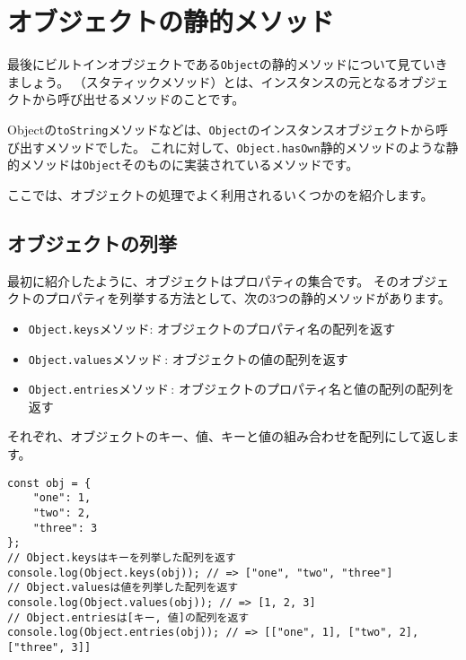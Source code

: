 \hypertarget{static-method}{%
\section{オブジェクトの静的メソッド}\label{static-method}}

最後にビルトインオブジェクトである\texttt{Object}の静的メソッドについて見ていきましょう。
\textbf{}（スタティックメソッド）とは、インスタンスの元となるオブジェクトから呼び出せるメソッドのことです。

Objectの\texttt{toString}メソッドなどは、\texttt{Object}のインスタンスオブジェクトから呼び出すメソッドでした。
これに対して、\texttt{Object.hasOwn}静的メソッドのような静的メソッドは\texttt{Object}そのものに実装されているメソッドです。

ここでは、オブジェクトの処理でよく利用されるいくつかの\textbf{}を紹介します。

\hypertarget{enumeration}{%
\subsection{オブジェクトの列挙}\label{enumeration}}

最初に紹介したように、オブジェクトはプロパティの集合です。
そのオブジェクトのプロパティを列挙する方法として、次の3つの静的メソッドがあります。

\begin{itemize}
\item
  \texttt{Object.keys}メソッド:
  オブジェクトのプロパティ名の配列を返す
\item
  \texttt{Object.values}メソッド\,\protect{}:
  オブジェクトの値の配列を返す
\item
  \texttt{Object.entries}メソッド\,\protect{}:
  オブジェクトのプロパティ名と値の配列の配列を返す
\end{itemize}

それぞれ、オブジェクトのキー、値、キーと値の組み合わせを配列にして返します。

\begin{lstlisting}
const obj = {
    "one": 1,
    "two": 2,
    "three": 3
};
// Object.keysはキーを列挙した配列を返す
console.log(Object.keys(obj)); // => ["one", "two", "three"]
// Object.valuesは値を列挙した配列を返す
console.log(Object.values(obj)); // => [1, 2, 3]
// Object.entriesは[キー, 値]の配列を返す
console.log(Object.entries(obj)); // => [["one", 1], ["two", 2], ["three", 3]]
\end{lstlisting}

